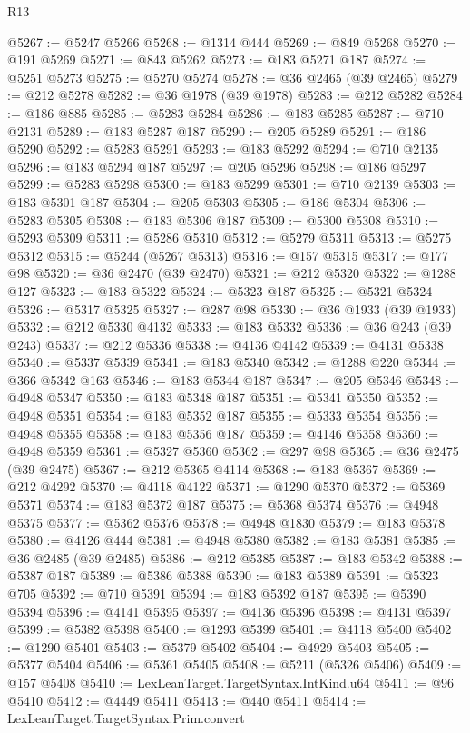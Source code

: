 \begin{lexlean}{R13}
\begin{coremodule}
@5267 := @5247 @5266
@5268 := @1314 @444
@5269 := @849 @5268
@5270 := @191 @5269
@5271 := @843 @5262
@5273 := @183 @5271 @187
@5274 := @5251 @5273
@5275 := @5270 @5274
@5278 := @36 @2465 (@39 @2465)
@5279 := @212 @5278
@5282 := @36 @1978 (@39 @1978)
@5283 := @212 @5282
@5284 := @186 @885
@5285 := @5283 @5284
@5286 := @183 @5285
@5287 := @710 @2131
@5289 := @183 @5287 @187
@5290 := @205 @5289
@5291 := @186 @5290
@5292 := @5283 @5291
@5293 := @183 @5292
@5294 := @710 @2135
@5296 := @183 @5294 @187
@5297 := @205 @5296
@5298 := @186 @5297
@5299 := @5283 @5298
@5300 := @183 @5299
@5301 := @710 @2139
@5303 := @183 @5301 @187
@5304 := @205 @5303
@5305 := @186 @5304
@5306 := @5283 @5305
@5308 := @183 @5306 @187
@5309 := @5300 @5308
@5310 := @5293 @5309
@5311 := @5286 @5310
@5312 := @5279 @5311
@5313 := @5275 @5312
@5315 := @5244 (@5267 @5313)
@5316 := @157 @5315
@5317 := @177 @98
@5320 := @36 @2470 (@39 @2470)
@5321 := @212 @5320
@5322 := @1288 @127
@5323 := @183 @5322
@5324 := @5323 @187
@5325 := @5321 @5324
@5326 := @5317 @5325
@5327 := @287 @98
@5330 := @36 @1933 (@39 @1933)
@5332 := @212 @5330 @4132
@5333 := @183 @5332
@5336 := @36 @243 (@39 @243)
@5337 := @212 @5336
@5338 := @4136 @4142
@5339 := @4131 @5338
@5340 := @5337 @5339
@5341 := @183 @5340
@5342 := @1288 @220
@5344 := @366 @5342 @163
@5346 := @183 @5344 @187
@5347 := @205 @5346
@5348 := @4948 @5347
@5350 := @183 @5348 @187
@5351 := @5341 @5350
@5352 := @4948 @5351
@5354 := @183 @5352 @187
@5355 := @5333 @5354
@5356 := @4948 @5355
@5358 := @183 @5356 @187
@5359 := @4146 @5358
@5360 := @4948 @5359
@5361 := @5327 @5360
@5362 := @297 @98
@5365 := @36 @2475 (@39 @2475)
@5367 := @212 @5365 @4114
@5368 := @183 @5367
@5369 := @212 @4292
@5370 := @4118 @4122
@5371 := @1290 @5370
@5372 := @5369 @5371
@5374 := @183 @5372 @187
@5375 := @5368 @5374
@5376 := @4948 @5375
@5377 := @5362 @5376
@5378 := @4948 @1830
@5379 := @183 @5378
@5380 := @4126 @444
@5381 := @4948 @5380
@5382 := @183 @5381
@5385 := @36 @2485 (@39 @2485)
@5386 := @212 @5385
@5387 := @183 @5342
@5388 := @5387 @187
@5389 := @5386 @5388
@5390 := @183 @5389
@5391 := @5323 @705
@5392 := @710 @5391
@5394 := @183 @5392 @187
@5395 := @5390 @5394
@5396 := @4141 @5395
@5397 := @4136 @5396
@5398 := @4131 @5397
@5399 := @5382 @5398
@5400 := @1293 @5399
@5401 := @4118 @5400
@5402 := @1290 @5401
@5403 := @5379 @5402
@5404 := @4929 @5403
@5405 := @5377 @5404
@5406 := @5361 @5405
@5408 := @5211 (@5326 @5406)
@5409 := @157 @5408
@5410 := LexLeanTarget.TargetSyntax.IntKind.u64
@5411 := @96 @5410
@5412 := @4449 @5411
@5413 := @440 @5411
@5414 := LexLeanTarget.TargetSyntax.Prim.convert

\end{coremodule}
\end{lexlean}
